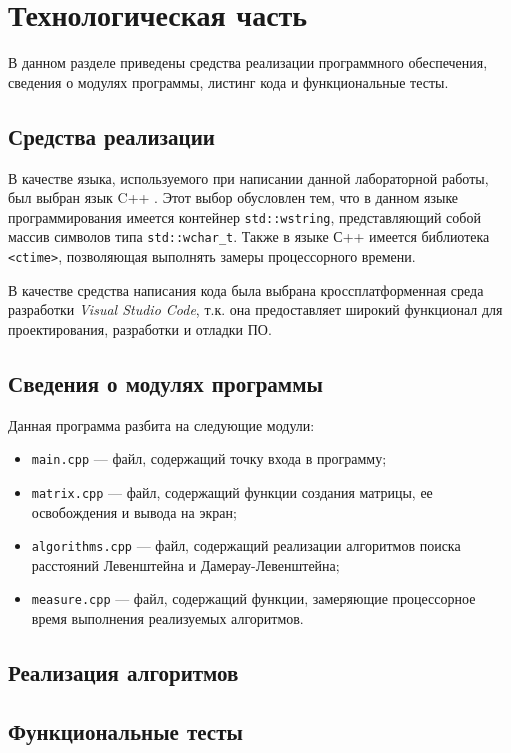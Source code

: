 \chapter{Технологическая часть}

В данном разделе приведены средства реализации программного обеспечения, сведения о модулях программы, листинг кода и функцио\-нальные тесты.

\section{Средства реализации}

В качестве языка, используемого при написании данной лабора\-торной работы, был выбран язык C++ \cite{cpp-lang}. Этот выбор обусловлен тем, что в данном языке программирования имеется контей\-нер \texttt{std::wstring}, представляющий собой массив символов типа \texttt{std::wchar\_t}. Также в языке С++ имеется библиотека \texttt{<ctime>}, позволяющая выполнять замеры процессорного времени.

В качестве средства написания кода была выбрана кроссплатфор\-менная среда разработки \textit{Visual Studio Code}, т.к. она предоставляет ши\-рокий функционал для проектирования, разработки и отладки ПО.

\section{Сведения о модулях программы}

Данная программа разбита на следующие модули:

\begin{itemize}
    \item \texttt{main.cpp} --- файл, содержащий точку входа в программу;
    \item \texttt{matrix.cpp} --- файл, содержащий функции создания матрицы, ее освобождения и вывода на экран;
    \item \texttt{algorithms.cpp} --- файл, содержащий реализации алгоритмов поиска расстояний Левенштейна и Дамерау-Левенштейна;
    \item \texttt{measure.cpp} --- файл, содержащий функции, замеряющие процес\-сорное время выполнения реализуемых алгоритмов.
\end{itemize}

\section{Реализация алгоритмов}

\section{Функциональные тесты}

